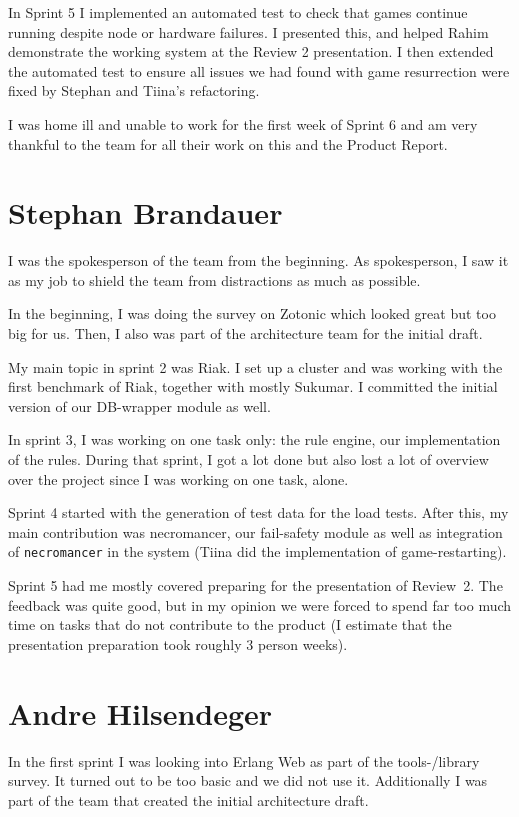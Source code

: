 \documentclass[11pt,a4paper]{report}
\begin{document}
In Sprint 5 I implemented an automated test to check that games continue running
despite node or hardware failures. I presented this, and helped Rahim
demonstrate the working system at the Review 2 presentation. I then extended the
automated test to ensure all issues we had found with game resurrection were
fixed by Stephan and Tiina's refactoring.

I was home ill and unable to work for the first week of Sprint 6 and am very
thankful to the team for all their work on this and the Product Report.

\section{Stephan Brandauer}
I was the spokesperson of the team from the beginning. As spokesperson,
I saw it as my job to shield the team from distractions as much as possible.

In the beginning, I was doing the survey on Zotonic which looked great but too
big for us. Then, I also was part of the architecture team for the initial
draft.

My main topic in sprint 2 was Riak. I set up a cluster and was working with the
first benchmark of Riak, together with mostly Sukumar.
I committed the initial version of our DB-wrapper module as well.

In sprint 3, I was working on one task only: the rule engine, our implementation
of the rules. During that sprint, I got a lot done but also lost a lot of
overview over the project since I was working on one task, alone.

Sprint 4 started with the generation of test data for the load tests. After
this, my main contribution was necromancer, our fail-safety module as well as
integration of {\tt necromancer} in the system (Tiina did the implementation
of game-restarting).

Sprint 5 had me mostly covered preparing for the presentation of Review~2.
The feedback was quite good, but in my opinion we were forced to spend far too
much time on tasks that do not contribute to the product (I estimate that the
presentation preparation took roughly 3 person weeks).

\section{Andre Hilsendeger}
In the first sprint I was looking into Erlang Web as part of the tools-/library
survey. It turned out to be too basic and we did not use it. Additionally I was
part of the team that created the initial architecture draft.
\end{document}
